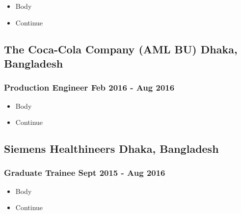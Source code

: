 \documentclass{article}
\newenvironment{mytemize}			%
{
\begin{itemize}[leftmargin=*]			%

	\setlength\itemsep{-0.25em}		%
	
}
{\end{itemize}}
\begin{document}
\vspace{-0.25em}
\begin{mytemize}

	\item Body
	\item Continue

\end{mytemize}



\vspace{-1.75em}			%

\subsection{\textbf{The Coca-Cola Company} (AML BU) \hfill Dhaka, Bangladesh} 

\vspace{-0.4em}
\subsubsection{Production Engineer \hfill Feb 2016 - Aug 2016}

\vspace{-0.25em}
\begin{mytemize}

	\item Body
	\item Continue

\end{mytemize}



\vspace{-1.75em}			%

\subsection{\textbf{Siemens Healthineers} \hfill Dhaka, Bangladesh}

\vspace{-0.4em}
\subsubsection{Graduate Trainee \hfill Sept 2015 - Aug 2016}

\vspace{-0.25em}
\begin{mytemize}

	\item Body
	\item Continue

\end{mytemize}
\end{document}
